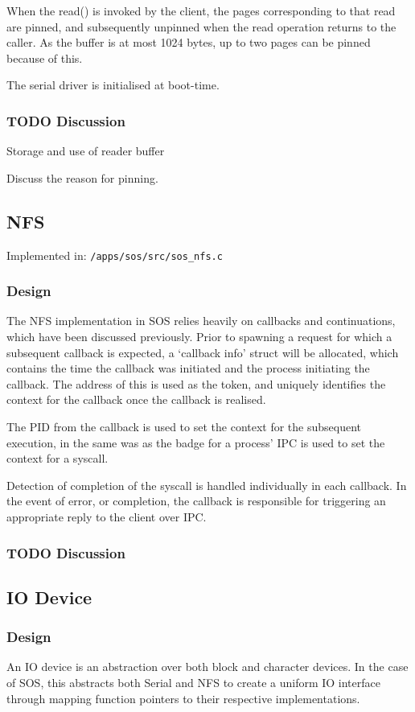 \documentclass[a4paper,12pt]{article}
\begin{document}
When the read() is invoked by the client, the pages corresponding to that read
are pinned, and subsequently unpinned when the read operation returns to the
caller.  As the buffer is at most 1024 bytes, up to two pages can be pinned
because of this.

The serial driver is initialised at boot-time.

\subsubsection{TODO Discussion}
Storage and use of reader buffer

Discuss the reason for pinning.

\subsection{NFS}
Implemented in: \texttt{/apps/sos/src/sos\_nfs.c}

\subsubsection{Design}
The NFS implementation in SOS relies heavily on callbacks and continuations,
which have been discussed previously.  Prior to spawning a request for which a
subsequent callback is expected, a `callback info' struct will be allocated,
which contains the time the callback was initiated and the process initiating
the callback.  The address of this is used as the token, and uniquely
identifies the context for the callback once the callback is realised.

The PID from the callback is used to set the context for the subsequent
execution, in the same was as the badge for a process' IPC is used to set the
context for a syscall.

Detection of completion of the syscall is handled individually in each
callback.  In the event of error, or completion, the callback is responsible
for triggering an appropriate reply to the client over IPC.

\subsubsection{TODO Discussion}

\subsection{IO Device}
\subsubsection{Design}
An IO device is an abstraction over both block and character devices.  In the
case of SOS, this abstracts both Serial and NFS to create a uniform IO
interface through mapping function pointers to their respective
implementations.
\end{document}
